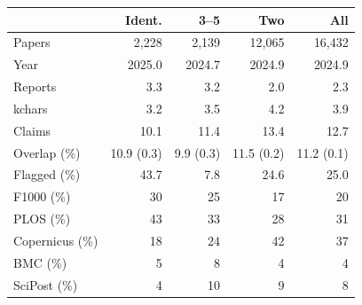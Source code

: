 \begin{tabular}{lrrrr}
\toprule
 & Ident. & 3--5 & Two & All \\
\midrule
Papers & 2,228 & 2,139 & 12,065 & 16,432 \\
Year & 2025.0 & 2024.7 & 2024.9 & 2024.9 \\
Reports & 3.3 & 3.2 & 2.0 & 2.3 \\
kchars & 3.2 & 3.5 & 4.2 & 3.9 \\
Claims & 10.1 & 11.4 & 13.4 & 12.7 \\
Overlap (\%) & 10.9 (0.3) & 9.9 (0.3) & 11.5 (0.2) & 11.2 (0.1) \\
Flagged (\%) & 43.7 & 7.8 & 24.6 & 25.0 \\
F1000 (\%) & 30 & 25 & 17 & 20 \\
PLOS (\%) & 43 & 33 & 28 & 31 \\
Copernicus (\%) & 18 & 24 & 42 & 37 \\
BMC (\%) & 5 & 8 & 4 & 4 \\
SciPost (\%) & 4 & 10 & 9 & 8 \\
\bottomrule
\end{tabular}
